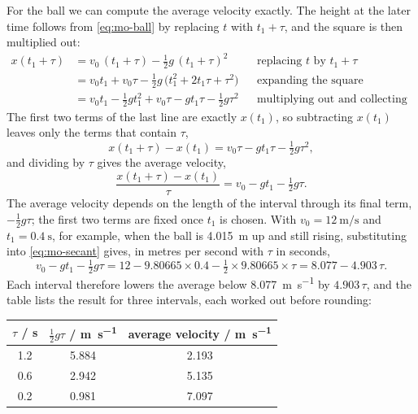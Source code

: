 For the ball we can compute the average velocity exactly. The height at
the later time follows from \cref{eq:mo-ball} by replacing $t$ with
$t_1+\tau$, and the square is then multiplied out:
\begin{align*}
   x(t_1+\tau) &= v_0\,(t_1+\tau) - \tfrac12 g\,(t_1+\tau)^2
      && \text{replacing $t$ by $t_1+\tau$}\\
   &= v_0 t_1 + v_0\tau - \tfrac12 g\,\bigl(t_1^2 + 2t_1\tau + \tau^2\bigr)
      && \text{expanding the square}\\
   &= v_0 t_1 - \tfrac12 g t_1^2 + v_0\tau - g t_1\tau - \tfrac12 g\tau^2
      && \text{multiplying out and collecting terms.}
\end{align*}
The first two terms of the last line are exactly $x(t_1)$, so subtracting
$x(t_1)$ leaves only the terms that contain $\tau$,
\begin{equation*}
   x(t_1+\tau) - x(t_1) = v_0\tau - g t_1\tau - \tfrac12 g\tau^2 ,
\end{equation*}
and dividing by $\tau$ gives the average velocity,
\begin{equation}
   \frac{x(t_1+\tau) - x(t_1)}{\tau} = v_0 - g t_1 - \tfrac12 g\tau .
   \label{eq:mo-secant}
\end{equation}
The average velocity depends on the length of the interval through its
final term, $-\tfrac12 g\tau$; the first two terms are fixed once $t_1$ is
chosen. With $v_0 = \SI{12}{\metre\per\second}$ and $t_1 =
\SI{0.4}{\second}$, for example, when the ball is \SI{4.015}{\metre} up
and still rising, substituting into \cref{eq:mo-secant}
gives, in metres per second with $\tau$ in seconds,
\begin{equation*}
   v_0 - g t_1 - \tfrac12 g\tau
   = 12 - 9.80665\times0.4 - \tfrac12\times9.80665\times\tau
   = 8.077 - 4.903\,\tau .
\end{equation*}
Each interval therefore lowers the average below \SI{8.077}{\metre\per
\second} by $4.903\,\tau$, and the table lists the result for three
intervals, each worked out before rounding:
\begin{center}
\begin{tabular}{ccc}
\toprule
$\tau$ / \si{\second} & $\tfrac12 g\tau$ / \si{\metre\per\second}
   & average velocity / \si{\metre\per\second}\\
\midrule
1.2 & 5.884 & 2.193\\
0.6 & 2.942 & 5.135\\
0.2 & 0.981 & 7.097\\
\bottomrule
\end{tabular}
\end{center}
